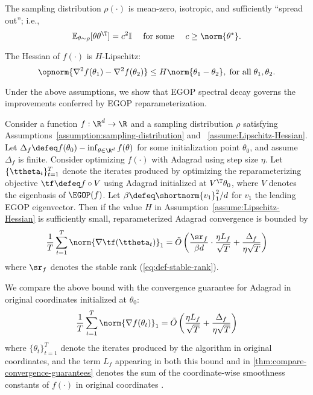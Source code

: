 \documentclass{article}
\begin{document}
\begin{assumption}\label{assumption:sampling-distribution}
    The sampling distribution $\rho(\cdot)$ is mean-zero, isotropic, and sufficiently ``spread out''; i.e.,
    \[
        \mathbb{E}_{\theta\sim \rho}[\theta \theta^\T] = c^2 \mathbb{I} \quad \text{ for some }\quad c \geq \norm{\theta^{\ast}}.
    \]
\end{assumption}

\begin{assumption}\label{assume:Lipschitz-Hessian}
    The Hessian of $f(\cdot)$ is $H$-Lipschitz:
    \[
        \opnorm{\nabla^2 f(\theta_1)-\nabla^2 f(\theta_2)} \leq H \norm{\theta_1-\theta_2}, \; \text{for all} \; \theta_1, \theta_2.
    \]
\end{assumption}

Under the above assumptions, we show that EGOP spectral decay governs the improvements conferred by EGOP reparameterization.
\begin{theorem}[Informal]\label{thm:compare-convergence-guarantees}
    Consider a function $f:\R^d\rightarrow \R$ and a sampling distribution $\rho$ satisfying Assumptions~\ref{assumption:sampling-distribution} and ~\ref{assume:Lipschitz-Hessian}. Let $\Delta_f \defeq f(\theta_0) - \inf_{\theta\in \R^d} f(\theta)$ for some initialization point $\theta_0$, and assume $\Delta_f$ is finite. Consider optimizing $f(\cdot)$ with Adagrad using step size $\eta$. Let $\{\ttheta_t\}_{t=1}^T$ denote the iterates produced by optimizing the reparameterizing objective $\tf \defeq f\circ V$ using Adagrad initialized at $V^\T \theta_0$, where $V$ denotes the eigenbasis of $\EGOP(f)$. Let $\beta \defeq \shortnorm{v_1}^2_1/d$ for $v_1$ the leading EGOP eigenvector. Then if the value $H$ in Assumption~\ref{assume:Lipschitz-Hessian} is sufficiently small, reparameterized Adagrad convergence is bounded by
    \[
        \frac{1}{T} \sum_{t=1}^T \norm{\nabla \tf(\ttheta_t)}_1 = \tilde{O}\left(\frac{\sr_f}{\beta d}\cdot \frac{\eta L_f}{\sqrt{T}} + \frac{\Delta_f}{\eta\sqrt{T}}\right)
    \]
    where $\sr_f$ denotes the stable rank (\ref{eq:def-stable-rank}). 
\end{theorem}
We compare the above bound with the convergence guarantee for Adagrad in original coordinates initialized at $\theta_0$:
    \[
        \frac{1}{T} \sum_{t=1}^T \norm{\nabla f(\theta_t)}_1 = \tilde{O}\left(\frac{\eta L_f}{\sqrt{T}} + \frac{\Delta_f}{\eta\sqrt{T}}\right)
    \]
where $\{\theta_t\}_{t=1}^T$ denote the iterates produced by the algorithm in original coordinates, and the term $L_f$ appearing in both this bound and in \cref{thm:compare-convergence-guarantees} denotes the sum of the coordinate-wise smoothness constants of $f(\cdot)$ in original coordinates \cite{jiang2024convergence, liu2024adagrad}.
\end{document}
